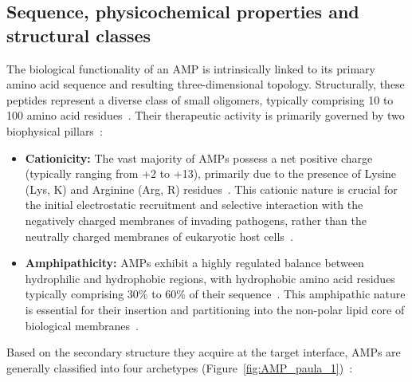 \subsection{Sequence, physicochemical properties and structural classes}

The biological functionality of an AMP is intrinsically linked to its primary amino acid sequence and resulting three-dimensional topology. Structurally, these peptides represent a diverse class of small oligomers, typically comprising 10 to 100 amino acid residues~\cite{Zasloff2002,numero_aa_amps,doi:10.1128/cmr.00056-05}. Their therapeutic activity is primarily governed by two biophysical pillars~\cite{Mookherjee2020}:

\begin{itemize}
    \item \textbf{Cationicity:} The vast majority of AMPs possess a net positive charge (typically ranging from +2 to +13), primarily due to the presence of Lysine (Lys, K) and Arginine (Arg, R) residues~\cite{numero_aa_amps}. This cationic nature is crucial for the initial electrostatic recruitment and selective interaction with the negatively charged membranes of invading pathogens, rather than the neutrally charged membranes of eukaryotic host cells~\cite{Zasloff2002,Mookherjee2020,Zhang2021}.
    \item \textbf{Amphipathicity:} AMPs exhibit a highly regulated balance between hydrophilic and hydrophobic regions, with hydrophobic amino acid residues typically comprising 30\% to 60\% of their sequence~\cite{hidrofobicidad_amps,Yeaman2003}. This amphipathic nature is essential for their insertion and partitioning into the non-polar lipid core of biological membranes~\cite{Deb2026}.
\end{itemize}

Based on the secondary structure they acquire at the target interface, AMPs are generally classified into four archetypes (Figure~\ref{fig:AMP_paula_1})~\cite{fermentation10110540,doi:10.1128/cmr.00056-05,paper_paula}:


